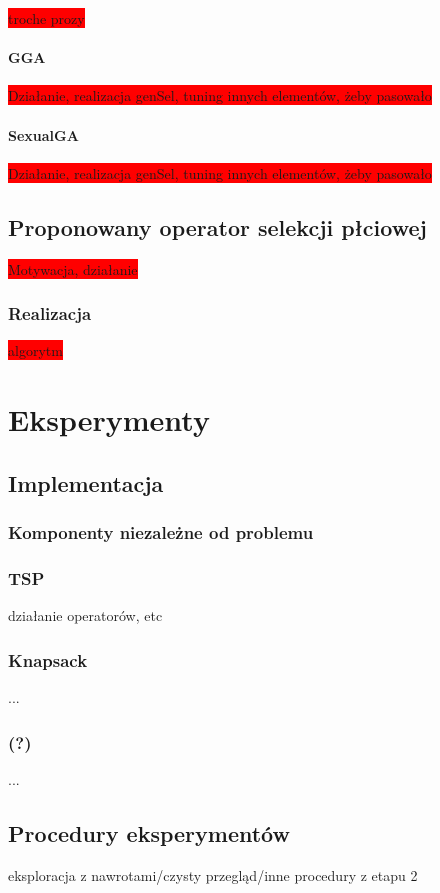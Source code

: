 \documentclass[twoside]{iisthesis}
\newcommand{\todo}{\colorbox{red}}
\begin{document}
\todo{troche prozy}

\subsubsection{GGA}

\todo{Działanie, realizacja genSel, tuning innych elementów, żeby pasowało}

\subsubsection{SexualGA}

\todo{Działanie, realizacja genSel, tuning innych elementów, żeby pasowało}

\section{Proponowany operator selekcji płciowej}

\todo{Motywacja, działanie}

\subsection{Realizacja}

\todo{algorytm}

\chapter{Eksperymenty}
\section{Implementacja}
\subsection{Komponenty niezależne od problemu}
\subsection{TSP}
działanie operatorów, etc
\subsection{Knapsack}
...
\subsection{(?)}
...
\section{Procedury eksperymentów}
eksploracja z nawrotami/czysty przegląd/inne procedury z etapu 2
\end{document}
